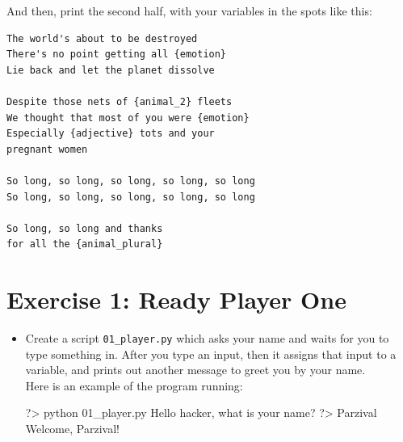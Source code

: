\documentclass{42-en}
\begin{document}
And then, print the second half, with your variables in the spots like this:\\
\begin{verbatim}
The world's about to be destroyed
There's no point getting all {emotion}
Lie back and let the planet dissolve

Despite those nets of {animal_2} fleets
We thought that most of you were {emotion}
Especially {adjective} tots and your
pregnant women

So long, so long, so long, so long, so long
So long, so long, so long, so long, so long

So long, so long and thanks
for all the {animal_plural}
\end{verbatim}

\nextexercice
\newpage


\chapter{Exercise 1: Ready Player One}

\makeheaderfiles

\begin{itemize}

\item Create a script \texttt{01\_player.py} which asks your name and waits for you to type something in. After you type an input, then it assigns that input to a variable, and prints out another message to greet you by your name.\\

Here is an example of the program running:
\begin{42console}
	?> python 01_player.py
	Hello hacker, what is your name?
	?> Parzival
	Welcome, Parzival!
\end{42console}

\end{itemize}
\end{document}
